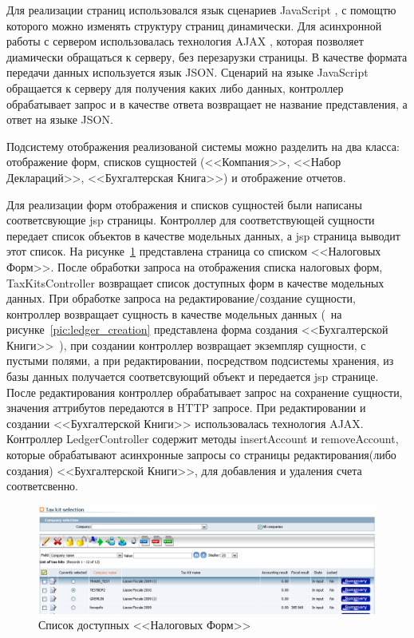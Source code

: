 \documentclass[14pt,a4paper]{reportmod}
\begin{document}
Для реализации страниц использовался язык сценариев JavaScript \cite{jsprogr}, с помощтю которого можно изменять структуру страниц динамически. Для асинхронной работы с сервером использовалась технология AJAX \cite{ajaxmast}, которая позволяет диамически обращаться к серверу, без перезарузки страницы. В качестве формата передачи данных используется язык JSON. Сценарий на языке JavaScript обращается к серверу для получения каких либо данных, контроллер обрабатывает запрос и в качестве ответа возвращает не название представления, а ответ на языке JSON.


Подсистему отображения реализованой системы можно разделить на два класса: отображение форм, списков сущностей (<<Компания>>, <<Набор Деклараций>>, <<Бухгалтерская Книга>>) и отображение отчетов.


Для реализации форм отображения и списков сущностей были написаны соответсвующие jsp страницы. Контроллер для соответствующей сущности передает список объектов в качестве модельных данных, а jsp страница выводит этот список. На рисунке~\ref{pic:taxkits_list} представлена страница со списком <<Налоговых Форм>>. После обработки запроса на отображения списка налоговых форм, TaxKitsController возвращает список доступных форм в качестве модельных данных. При обработке запроса на редактирование/создание сущности, контроллер возвращает сущность в качестве модельных данных (~на рисунке~\ref{pic:ledger_creation} представлена форма создания <<Бухгалтерской Книги>>~), при создании контроллер возвращает экземпляр сущности, с пустыми полями, а при редактировании, посредством подсистемы хранения, из базы данных получается соответсвующий объект и передается jsp странице. После редактирования контроллер обрабатывает запрос на сохранение сущности, значения аттрибутов передаются в HTTP запросе. При редактировании и создании <<Бухгалтерской Книги>> использовалась технология AJAX. Контроллер LedgerController содержит методы insertAccount и removeAccount, которые обрабатывают асинхронные запросы со страницы редактирования(либо создания) <<Бухгалтерской Книги>>, для добавления и удаления счета соответсвенно.


\begin{figure}
  \centering
  \includegraphics[scale=0.43]{pics/scr_taxkit_list}
  \caption{Список доступных <<Налоговых Форм>>}
  \label{pic:taxkits_list}
\end{figure}
\end{document}
